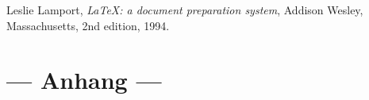 \documentclass[../Report.tex]{subfiles}
\begin{document}


\begin{thebibliography}{9}

  Leslie Lamport,
  \textit{\LaTeX: a document preparation system},
  Addison Wesley, Massachusetts,
  2nd edition,
  1994.

\end{thebibliography}

\chapter{--- Anhang --- }
\label{chap:anhang}


\end{document}
